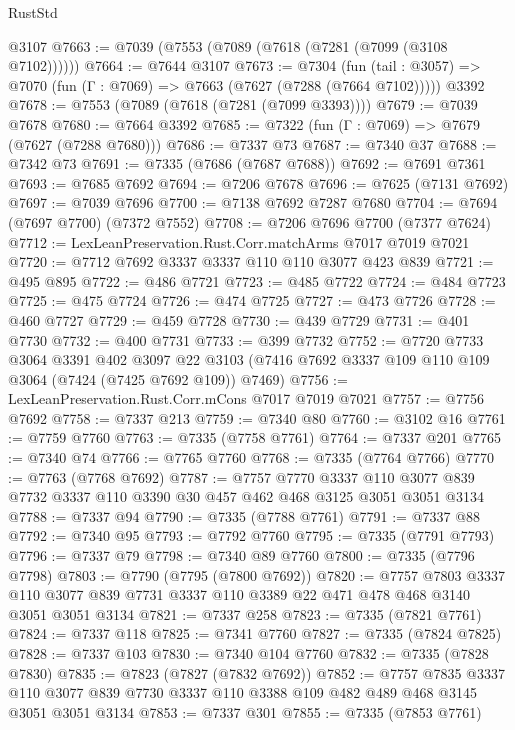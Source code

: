 \begin{lexlean}{RustStd}
\begin{coremodule}
    @3107
@7663 := @7039 (@7553 (@7089 (@7618 (@7281 (@7099 (@3108 @7102))))))
@7664 := @7644 @3107
@7673 := @7304
    (fun (tail : @3057) => @7070 (fun (Γ : @7069) => @7663 (@7627 (@7288 (@7664 @7102)))))
    @3392
@7678 := @7553 (@7089 (@7618 (@7281 (@7099 @3393))))
@7679 := @7039 @7678
@7680 := @7664 @3392
@7685 := @7322 (fun (Γ : @7069) => @7679 (@7627 (@7288 @7680)))
@7686 := @7337 @73
@7687 := @7340 @37
@7688 := @7342 @73
@7691 := @7335 (@7686 (@7687 @7688))
@7692 := @7691 @7361
@7693 := @7685 @7692
@7694 := @7206 @7678
@7696 := @7625 (@7131 @7692)
@7697 := @7039 @7696
@7700 := @7138 @7692 @7287 @7680
@7704 := @7694 (@7697 @7700) (@7372 @7552)
@7708 := @7206 @7696 @7700 (@7377 @7624)
@7712 := LexLeanPreservation.Rust.Corr.matchArms @7017 @7019 @7021
@7720 := @7712 @7692 @3337 @3337 @110 @110 @3077 @423 @839
@7721 := @495 @895
@7722 := @486 @7721
@7723 := @485 @7722
@7724 := @484 @7723
@7725 := @475 @7724
@7726 := @474 @7725
@7727 := @473 @7726
@7728 := @460 @7727
@7729 := @459 @7728
@7730 := @439 @7729
@7731 := @401 @7730
@7732 := @400 @7731
@7733 := @399 @7732
@7752 := @7720
    @7733
    @3064
    @3391
    @402
    @3097
    @22
    @3103
    (@7416 @7692 @3337 @109 @110 @109 @3064 (@7424 (@7425 @7692 @109)) @7469)
@7756 := LexLeanPreservation.Rust.Corr.mCons @7017 @7019 @7021
@7757 := @7756 @7692
@7758 := @7337 @213
@7759 := @7340 @80
@7760 := @3102 @16
@7761 := @7759 @7760
@7763 := @7335 (@7758 @7761)
@7764 := @7337 @201
@7765 := @7340 @74
@7766 := @7765 @7760
@7768 := @7335 (@7764 @7766)
@7770 := @7763 (@7768 @7692)
@7787 := @7757
    @7770
    @3337
    @110
    @3077
    @839
    @7732
    @3337
    @110
    @3390
    @30
    @457
    @462
    @468
    @3125
    @3051
    @3051
    @3134
@7788 := @7337 @94
@7790 := @7335 (@7788 @7761)
@7791 := @7337 @88
@7792 := @7340 @95
@7793 := @7792 @7760
@7795 := @7335 (@7791 @7793)
@7796 := @7337 @79
@7798 := @7340 @89 @7760
@7800 := @7335 (@7796 @7798)
@7803 := @7790 (@7795 (@7800 @7692))
@7820 := @7757
    @7803
    @3337
    @110
    @3077
    @839
    @7731
    @3337
    @110
    @3389
    @22
    @471
    @478
    @468
    @3140
    @3051
    @3051
    @3134
@7821 := @7337 @258
@7823 := @7335 (@7821 @7761)
@7824 := @7337 @118
@7825 := @7341 @7760
@7827 := @7335 (@7824 @7825)
@7828 := @7337 @103
@7830 := @7340 @104 @7760
@7832 := @7335 (@7828 @7830)
@7835 := @7823 (@7827 (@7832 @7692))
@7852 := @7757
    @7835
    @3337
    @110
    @3077
    @839
    @7730
    @3337
    @110
    @3388
    @109
    @482
    @489
    @468
    @3145
    @3051
    @3051
    @3134
@7853 := @7337 @301
@7855 := @7335 (@7853 @7761)

\end{coremodule}
\end{lexlean}
